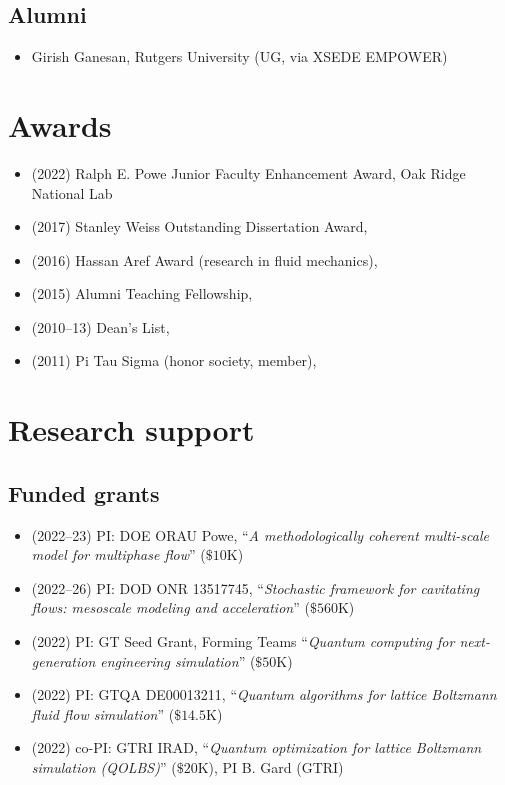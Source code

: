 \subsection{Alumni}

\begin{itemize}
    \item Girish Ganesan, Rutgers University (UG, via XSEDE EMPOWER)
\end{itemize}

\section{Awards}

\begin{itemize}
    \item (2022) Ralph E. Powe Junior Faculty Enhancement Award, Oak Ridge National Lab
    \item (2017) Stanley Weiss Outstanding Dissertation Award, \UIUC
    \item (2016) Hassan Aref Award (research in fluid mechanics), \UIUC
    \item (2015) Alumni Teaching Fellowship, \UIUC
    \item (2010--13) Dean's List, \UMD
    \item (2011) Pi Tau Sigma (honor society, member), \UMD
\end{itemize}

\section{Research support}

\subsection{Funded grants}

\begin{itemize}
    \item (2022--23) PI: DOE ORAU Powe, ``\textit{A methodologically coherent multi-scale model for multiphase flow}'' ($\$10$K)
    \item (2022--26) PI: DOD ONR 13517745, ``\textit{Stochastic framework for cavitating flows: mesoscale modeling and acceleration}'' ($\$560$K)
    \item (2022) PI: GT Seed Grant, Forming Teams ``\textit{Quantum computing for next-generation engineering simulation}'' ($\$50$K)
    \item (2022) PI: GTQA DE00013211, ``\textit{Quantum algorithms for lattice Boltzmann fluid flow simulation}'' ($\$14.5$K)
    \item (2022) co-PI: GTRI IRAD, ``\textit{Quantum optimization for lattice Boltzmann simulation (QOLBS)}'' ($\$20$K), PI B. Gard (GTRI)
\end{itemize}


